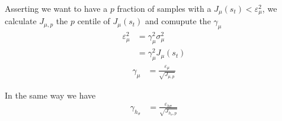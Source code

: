 \documentclass[]{article}
\begin{document}
Asserting we want to have a $ p $ fraction of samples with a $ J_\mu(s_t) < \varepsilon_\mu^2 $, we calculate $ J_{\mu, p} $ the $ p $ centile of $ J_\mu(s_t) $ and comupute the $ \gamma_\mu $
\begin{align*}
	\varepsilon^2_\mu&	= \gamma_\mu^2 \sigma^2_\mu
	\\
	&					= \gamma^2_\mu J_\mu(s_t)
\end{align*}
\begin{align}
	\gamma_\mu&		= \frac{\varepsilon_\mu}{\sqrt{J_{\mu,p}}}
\end{align}

In the same way we have 
\begin{align}
	\gamma_{h_\sigma}&	= \frac{\varepsilon_{h\sigma}}{\sqrt{J_{h_\sigma, p} } }
\end{align}
\end{document}
